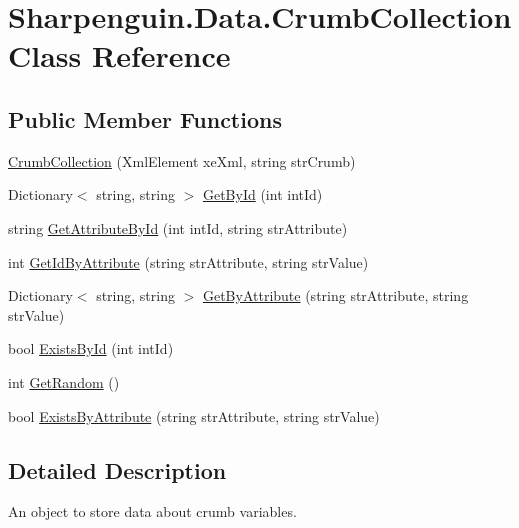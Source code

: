 \hypertarget{classSharpenguin_1_1Data_1_1CrumbCollection}{\section{\-Sharpenguin.\-Data.\-Crumb\-Collection \-Class \-Reference}
\label{classSharpenguin_1_1Data_1_1CrumbCollection}
}
\subsection*{\-Public \-Member \-Functions}
\begin{DoxyCompactItemize}
\item 
\hyperlink{classSharpenguin_1_1Data_1_1CrumbCollection_aeefd8faadc89d85f59ee2223c47c24a9}{\-Crumb\-Collection} (\-Xml\-Element xe\-Xml, string str\-Crumb)
\item 
\-Dictionary$<$ string, string $>$ \hyperlink{classSharpenguin_1_1Data_1_1CrumbCollection_a0c8af876261150c40436bcb4c698faf3}{\-Get\-By\-Id} (int int\-Id)
\item 
string \hyperlink{classSharpenguin_1_1Data_1_1CrumbCollection_adcc3b86f4cdebfe920e97816d44d3ca6}{\-Get\-Attribute\-By\-Id} (int int\-Id, string str\-Attribute)
\item 
int \hyperlink{classSharpenguin_1_1Data_1_1CrumbCollection_aab1d2fa0c953146e2088ca2d2f385cb4}{\-Get\-Id\-By\-Attribute} (string str\-Attribute, string str\-Value)
\item 
\-Dictionary$<$ string, string $>$ \hyperlink{classSharpenguin_1_1Data_1_1CrumbCollection_ac9757538efe7eedc08f585e1f6016342}{\-Get\-By\-Attribute} (string str\-Attribute, string str\-Value)
\item 
bool \hyperlink{classSharpenguin_1_1Data_1_1CrumbCollection_a256a32b5acf1606e9b2a9358cb633fca}{\-Exists\-By\-Id} (int int\-Id)
\item 
int \hyperlink{classSharpenguin_1_1Data_1_1CrumbCollection_aa6f5dbfc599684eaa9afc32b8f0f6ea0}{\-Get\-Random} ()
\item 
bool \hyperlink{classSharpenguin_1_1Data_1_1CrumbCollection_a4ee392cc6fe5cb910b433996560a13fe}{\-Exists\-By\-Attribute} (string str\-Attribute, string str\-Value)
\end{DoxyCompactItemize}


\subsection{\-Detailed \-Description}
\-An object to store data about crumb variables. 

